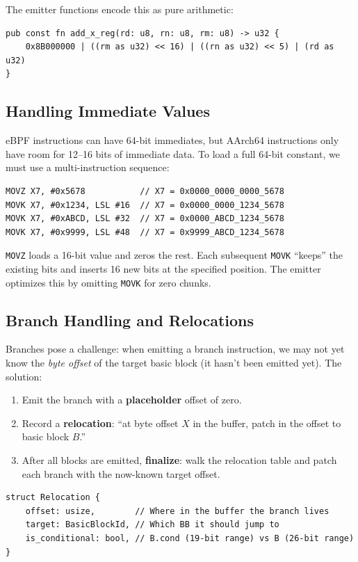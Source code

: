 \documentclass[11pt,letterpaper]{article}
\begin{document}
The emitter functions encode this as pure arithmetic:
\begin{lstlisting}[style=rust]
pub const fn add_x_reg(rd: u8, rn: u8, rm: u8) -> u32 {
    0x8B000000 | ((rm as u32) << 16) | ((rn as u32) << 5) | (rd as u32)
}
\end{lstlisting}

\subsection{Handling Immediate Values}

eBPF instructions can have 64-bit immediates, but AArch64 instructions only have room for 12--16 bits of immediate data. To load a full 64-bit constant, we must use a multi-instruction sequence:

\begin{lstlisting}[style=asm]
MOVZ X7, #0x5678           // X7 = 0x0000_0000_0000_5678
MOVK X7, #0x1234, LSL #16  // X7 = 0x0000_0000_1234_5678
MOVK X7, #0xABCD, LSL #32  // X7 = 0x0000_ABCD_1234_5678
MOVK X7, #0x9999, LSL #48  // X7 = 0x9999_ABCD_1234_5678
\end{lstlisting}

\texttt{MOVZ} loads a 16-bit value and zeros the rest. Each subsequent \texttt{MOVK} ``keeps'' the existing bits and inserts 16 new bits at the specified position. The emitter optimizes this by omitting \texttt{MOVK} for zero chunks.

\subsection{Branch Handling and Relocations}

Branches pose a challenge: when emitting a branch instruction, we may not yet know the \emph{byte offset} of the target basic block (it hasn't been emitted yet). The solution:

\begin{enumerate}
    \item Emit the branch with a \textbf{placeholder} offset of zero.
    \item Record a \textbf{relocation}: ``at byte offset $X$ in the buffer, patch in the offset to basic block $B$.''
    \item After all blocks are emitted, \textbf{finalize}: walk the relocation table and patch each branch with the now-known target offset.
\end{enumerate}

\begin{lstlisting}[style=rust]
struct Relocation {
    offset: usize,        // Where in the buffer the branch lives
    target: BasicBlockId, // Which BB it should jump to
    is_conditional: bool, // B.cond (19-bit range) vs B (26-bit range)
}
\end{lstlisting}
\end{document}
